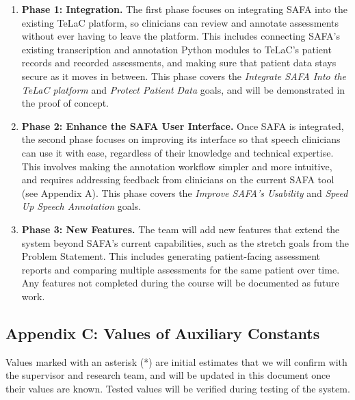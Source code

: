 \documentclass[12pt]{article}
\begin{document}
\begin{enumerate}
  \item \textbf{Phase 1: Integration.} The first phase focuses on integrating SAFA
  into the existing TeLaC platform, so clinicians can review and annotate assessments
  without ever having to leave the platform. This includes connecting SAFA's existing transcription
  and annotation Python modules to TeLaC's patient records and recorded assessments,
  and making sure that patient data stays secure as it moves in between. This phase
  covers the \textit{Integrate SAFA Into the TeLaC platform} and \textit{Protect
  Patient Data} goals, and will be demonstrated in the proof of concept.

  \item \textbf{Phase 2: Enhance the SAFA User Interface.} Once SAFA is
  integrated, the second phase focuses on improving its interface so that
  speech clinicians can use it with ease, regardless of their knowledge and
  technical expertise. This involves making the annotation workflow simpler and more
  intuitive, and requires addressing feedback from clinicians on the current SAFA tool (see
  Appendix A). This phase covers the \textit{Improve SAFA's Usability} and
  \textit{Speed Up Speech Annotation} goals.

  \item \textbf{Phase 3: New Features.} The team will add new features that extend the system beyond
  SAFA's current capabilities, such as the stretch goals from the Problem
  Statement. This includes generating patient-facing assessment reports and comparing multiple
  assessments for the same patient over time. Any features not completed during
  the course will be documented as future work.
\end{enumerate}

\subsection{Appendix C: Values of Auxiliary Constants} \label{sec:AppendixC}

Values marked with an asterisk (*) are initial estimates that we will confirm with the supervisor and research team, and will be updated in this document once their values are known. Tested values will be verified during testing of the system.
\end{document}
